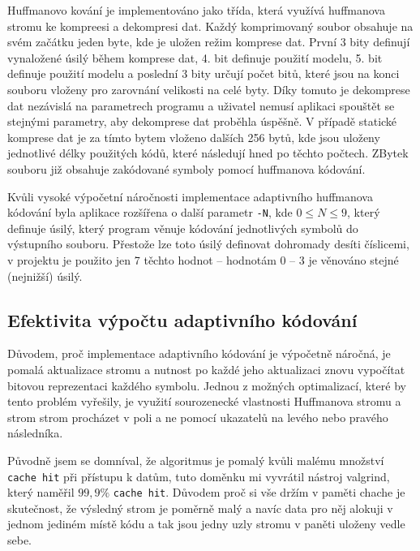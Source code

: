 \documentclass[11pt,a4paper,titlepage]{article}
\begin{document}
        Huffmanovo kování je implementováno jako třída, která využívá huffmanova stromu ke kompreesi a dekompresi dat. Každý komprimovaný soubor obsahuje
        na svém začátku jeden byte, kde je uložen režim komprese dat. První 3 bity definují vynaložené úsilý během komprese dat, 4. bit definuje
        použití modelu, 5. bit definuje použití modelu a poslední 3 bity určují počet bitů, které jsou na konci souboru vloženy pro zarovnání velikosti
        na celé byty. Díky tomuto je dekomprese dat nezávislá na parametrech programu a uživatel nemusí aplikaci spouštět se stejnými parametry, aby
        dekomprese dat proběhla úspěšně. V případě statické komprese dat je za tímto bytem vloženo dalších 256 bytů, kde jsou uloženy jednotlivé délky
        použitých kódů, které následují hned po těchto počtech. ZBytek souboru již obsahuje zakódované symboly pomocí huffmanova kódování.

        Kvůli vysoké výpočetní náročnosti implementace adaptivního huffmanova kódování byla aplikace rozšířena o další parametr \texttt{-N}, kde $0 \leq N \leq 9$,
        který definuje úsilý, který program věnuje kódování jednotlivých symbolů do výstupního souboru. Přestože lze toto úsilý definovat dohromady desíti
        číslicemi, v projektu je použito jen 7 těchto hodnot -- hodnotám 0 -- 3 je věnováno stejné (nejnižší) úsilý.

        \subsection{Efektivita výpočtu adaptivního kódování}
            Důvodem, proč implementace adaptivního kódování je výpočetně náročná, je pomalá aktualizace stromu a nutnost
            po každé jeho aktualizaci znovu vypočítat bitovou reprezentaci každého symbolu. Jednou z možných optimalizací,
            které by tento problém vyřešily, je využití sourozenecké vlastnosti Huffmanova stromu a strom strom procházet
            v poli a ne pomocí ukazatelů na levého nebo pravého následníka.

            Původně jsem se domníval, že algoritmus je pomalý kvůli malému množství \texttt{cache hit} při přístupu k datům, tuto doměnku
            mi vyvrátil nástroj valgrind, který naměřil $99,9\%$ \texttt{cache hit}. Důvodem proč si vše držím v paměti chache je skutečnost,
            že výsledný strom je poměrně malý a navíc data pro něj alokuji v jednom jediném místě kódu a tak jsou jedny uzly stromu v paněti uloženy
            vedle sebe.
\end{document}
